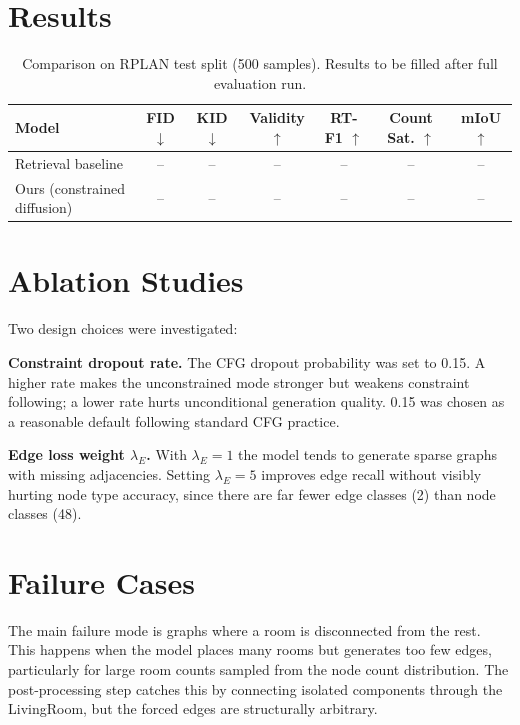\documentclass[11pt]{article}
\begin{document}
\section{Results}

\begin{table}[h]
\centering
\begin{tabular}{lcccccc}
\toprule
Model & FID $\downarrow$ & KID $\downarrow$ & Validity $\uparrow$ & RT-F1 $\uparrow$ & Count Sat. $\uparrow$ & mIoU $\uparrow$ \\
\midrule
Retrieval baseline & -- & -- & -- & -- & -- & -- \\
Ours (constrained diffusion) & -- & -- & -- & -- & -- & -- \\
\bottomrule
\end{tabular}
\caption{Comparison on RPLAN test split (500 samples). Results to be filled after full evaluation run.}
\end{table}

\section{Ablation Studies}

Two design choices were investigated:

\textbf{Constraint dropout rate.} The CFG dropout probability was set to 0.15. A higher rate makes the unconstrained mode stronger but weakens constraint following; a lower rate hurts unconditional generation quality. 0.15 was chosen as a reasonable default following standard CFG practice.

\textbf{Edge loss weight $\lambda_E$.} With $\lambda_E = 1$ the model tends to generate sparse graphs with missing adjacencies. Setting $\lambda_E = 5$ improves edge recall without visibly hurting node type accuracy, since there are far fewer edge classes (2) than node classes (48).

\section{Failure Cases}

The main failure mode is graphs where a room is disconnected from the rest. This happens when the model places many rooms but generates too few edges, particularly for large room counts sampled from the node count distribution. The post-processing step catches this by connecting isolated components through the LivingRoom, but the forced edges are structurally arbitrary.
\end{document}
